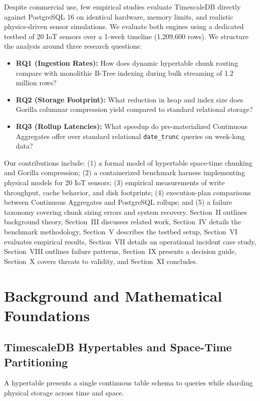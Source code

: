 \documentclass[conference,a4paper]{IEEEtran}
\newcommand{\code}[1]{\texttt{\small #1}}
\begin{document}
Despite commercial use, few empirical studies evaluate TimescaleDB directly against PostgreSQL 16 on identical hardware, memory limits, and realistic physics-driven sensor simulations. We evaluate both engines using a dedicated testbed of 20 IoT sensors over a 1-week timeline (1,209,600 rows). We structure the analysis around three research questions:
\begin{itemize}
    \item \textbf{RQ1 (Ingestion Rates):} How does dynamic hypertable chunk routing compare with monolithic B-Tree indexing during bulk streaming of 1.2 million rows?
    \item \textbf{RQ2 (Storage Footprint):} What reduction in heap and index size does Gorilla columnar compression yield compared to standard relational storage?
    \item \textbf{RQ3 (Rollup Latencies):} What speedup do pre-materialized Continuous Aggregates offer over standard relational \code{date\_trunc} queries on week-long data?
\end{itemize}

Our contributions include: (1) a formal model of hypertable space-time chunking and Gorilla compression; (2) a containerized benchmark harness implementing physical models for 20 IoT sensors; (3) empirical measurements of write throughput, cache behavior, and disk footprints; (4) execution-plan comparisons between Continuous Aggregates and PostgreSQL rollups; and (5) a failure taxonomy covering chunk sizing errors and system recovery. Section~II outlines background theory, Section~III discusses related work, Section~IV details the benchmark methodology, Section~V describes the testbed setup, Section~VI evaluates empirical results, Section~VII details an operational incident case study, Section~VIII outlines failure patterns, Section~IX presents a decision guide, Section~X covers threats to validity, and Section~XI concludes.

\section{Background and Mathematical Foundations}

\subsection{TimescaleDB Hypertables and Space-Time Partitioning}
A hypertable presents a single continuous table schema to queries while sharding physical storage across time and space.
\end{document}
